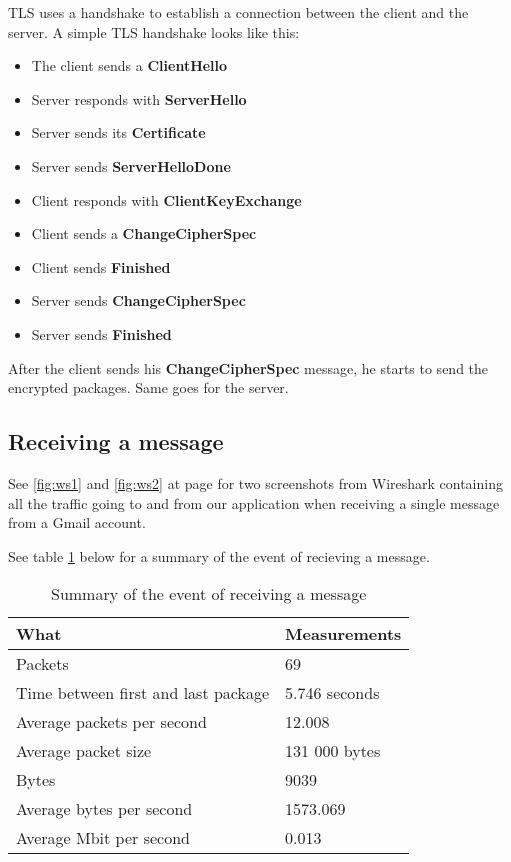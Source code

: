 \newpage

TLS uses a handshake to establish a connection between the client and the server.
A simple TLS handshake looks like this:
\begin{itemize}
\item{}The client sends a \textbf{ClientHello}
\item{}Server responds with \textbf{ServerHello}
\item{}Server sends its \textbf{Certificate}
\item{}Server sends \textbf{ServerHelloDone}
\item{}Client responds with \textbf{ClientKeyExchange}
\item{}Client sends a \textbf{ChangeCipherSpec}
\item{}Client sends \textbf{Finished}
\item{}Server sends \textbf{ChangeCipherSpec}
\item{}Server sends \textbf{Finished}
\end{itemize}

After the client sends his \textbf{ChangeCipherSpec} message, he starts to send the encrypted packages. Same goes for the server. 

\subsection{Receiving a message}

See \ref{fig:ws1} and \ref{fig:ws2} at page \pageref{fig:ws1} for two screenshots from Wireshark containing all the traffic going to and from our application when receiving a single message from a Gmail account.

See table \ref{tab:summaryrecmes} below for a summary of the event of recieving a message.
\begin{table}[h!]
\begin{center}
\begin{tabular}{l|l} \hline
\textbf{What} & \textbf{Measurements} \\ \hline \hline
Packets & 69 \\
Time between first and last package & 5.746 seconds \\
Average packets per second & 12.008 \\
Average packet size & 131 000 bytes \\
Bytes & 9039 \\
Average bytes per second & 1573.069 \\
Average Mbit per second & 0.013 \\ \hline
\end{tabular}
\end{center}
\caption{Summary of the event of receiving a message} \label{tab:summaryrecmes}
\end{table}

